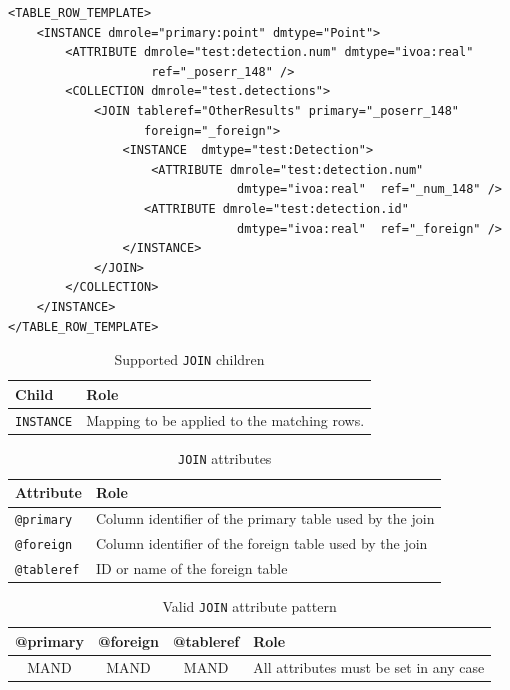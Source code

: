 \documentclass[11pt,a4paper]{ivoa}
\begin{document}
\begin{lstlisting}[caption={JOIN example},style=XML]
<TABLE_ROW_TEMPLATE>
    <INSTANCE dmrole="primary:point" dmtype="Point">
        <ATTRIBUTE dmrole="test:detection.num" dmtype="ivoa:real"
                    ref="_poserr_148" />
        <COLLECTION dmrole="test.detections">
            <JOIN tableref="OtherResults" primary="_poserr_148"
                   foreign="_foreign">
                <INSTANCE  dmtype="test:Detection">
                    <ATTRIBUTE dmrole="test:detection.num" 
                                dmtype="ivoa:real"  ref="_num_148" />
                   <ATTRIBUTE dmrole="test:detection.id" 
                                dmtype="ivoa:real"  ref="_foreign" />
                </INSTANCE>
            </JOIN>
        </COLLECTION>
    </INSTANCE>
</TABLE_ROW_TEMPLATE>
\end{lstlisting}


\begin{table}[hbtp]
\small
\centering
\begin{tabulary}{\linewidth}{|L|J|}
\hline
    \textbf{Child} &
    \textbf{Role} \\
\hline \hline
     \texttt{INSTANCE}    &
     Mapping to be applied to the matching rows.  \\       
\hline
\end{tabulary}
     \caption{Supported  \texttt{JOIN} children} 
     \label{tbl:join-children}
\end{table}

\begin{table}[!htbp]
\small
\centering
\begin{tabulary}{\linewidth}{|L|J|}
       \hline
           \textbf{Attribute} &  
           \textbf{Role} \\
       \hline  \hline
           \texttt{@primary}    & 
           Column identifier of the primary table used  by the join \\       
       \hline  
           \texttt{@foreign}    & 
           Column identifier of the foreign table used  by the join \\       
      \hline  
           \texttt{@tableref}    & 
           ID or name of the foreign table \\       
       \hline 
\end{tabulary}
\caption{\texttt{JOIN} attributes} 
\label{tbl:join-att}
\end{table}

\begin{table}[!htbp]
\small
\centering
\begin{tabulary}{\linewidth}{|C|C|C|J|}
       \hline \hline
           \textbf{@primary} &  
           \textbf{@foreign} &                     
           \textbf{@tableref} &          
           \textbf{Role} \\
       \hline  
           MAND    &            
           MAND    &            
           MAND    & 
           All attributes must be set in any case \\       
       \hline 
\end{tabulary}
\caption{Valid \texttt{JOIN} attribute pattern} 
\label{tbl:join-patterns}
\end{table}
\FloatBarrier
\end{document}
